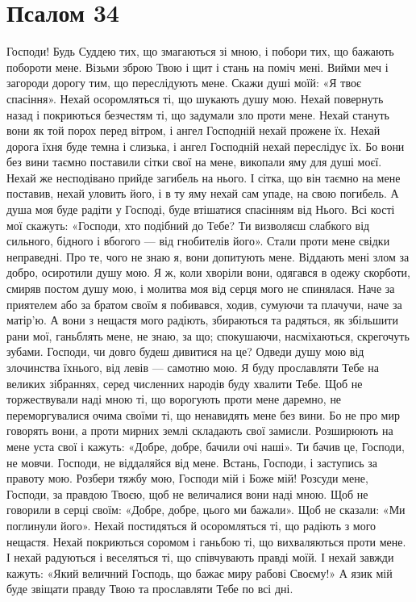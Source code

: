 \documentclass[chapters.tex]{subfiles}
\begin{document}
\section{Псалом 34}
Господи! Будь Суддею тих, що змагаються зі мною, і побори тих, що бажають побороти мене. Візьми зброю Твою і щит і стань на поміч мені. Вийми меч і загороди дорогу тим, що переслідують мене. Скажи душі моїй: «Я твоє спасіння». Нехай осоромляться ті, що шукають душу мою. Нехай повернуть назад і покриються безчестям ті, що задумали зло проти мене. Нехай стануть вони як той порох перед вітром, і ангел Господній нехай прожене їх. Нехай дорога їхня буде темна і слизька, і ангел Господній нехай переслідує їх. Бо вони без вини таємно поставили сітки свої на мене, викопали яму для душі моєї. Нехай же несподівано прийде загибель на нього. І сітка, що він таємно на мене поставив, нехай уловить його, і в ту яму нехай сам упаде, на свою погибель. А душа моя буде радіти у Господі, буде втішатися спасінням від Нього. Всі кості мої скажуть: «Господи, хто подібний до Тебе? Ти визволяєш слабкого від сильного, бідного і вбогого — від гнобителів його». Стали проти мене свідки неправедні. Про те, чого не знаю я, вони допитують мене. Віддають мені злом за добро, осиротили душу мою. Я ж, коли хворіли вони, одягався в одежу скорботи, смиряв постом душу мою, і молитва моя від серця мого не спинялася. Наче за приятелем або за братом своїм я побивався, ходив, сумуючи та плачучи, наче за матір’ю. А вони з нещастя мого радіють, збираються та радяться, як збільшити рани мої, ганьблять мене, не знаю, за що; спокушаючи, насміхаються, скрегочуть зубами. Господи, чи довго будеш дивитися на це? Одведи душу мою від злочинства їхнього, від левів — самотню мою. Я буду прославляти Тебе на великих зібраннях, серед численних народів буду хвалити Тебе. Щоб не торжествували наді мною ті, що ворогують проти мене даремно, не переморгувалися очима своїми ті, що ненавидять мене без вини. Бо не про мир говорять вони, а проти мирних землі складають свої замисли. Розширюють на мене уста свої і кажуть: «Добре, добре, бачили очі наші». Ти бачив це, Господи, не мовчи. Господи, не віддаляйся від мене. Встань, Господи, і заступись за правоту мою. Розбери тяжбу мою, Господи мій і Боже мій! Розсуди мене, Господи, за правдою Твоєю, щоб не величалися вони наді мною. Щоб не говорили в серці своїм: «Добре, добре, цього ми бажали». Щоб не сказали: «Ми поглинули його». Нехай постидяться й осоромляться ті, що радіють з мого нещастя. Нехай покриються соромом і ганьбою ті, що вихваляються проти мене. І нехай радуються і веселяться ті, що співчувають правді моїй. І нехай завжди кажуть: «Який величний Господь, що бажає миру рабові Своєму!» А язик мій буде звіщати правду Твою та прославляти Тебе по всі дні.
\end{document}
